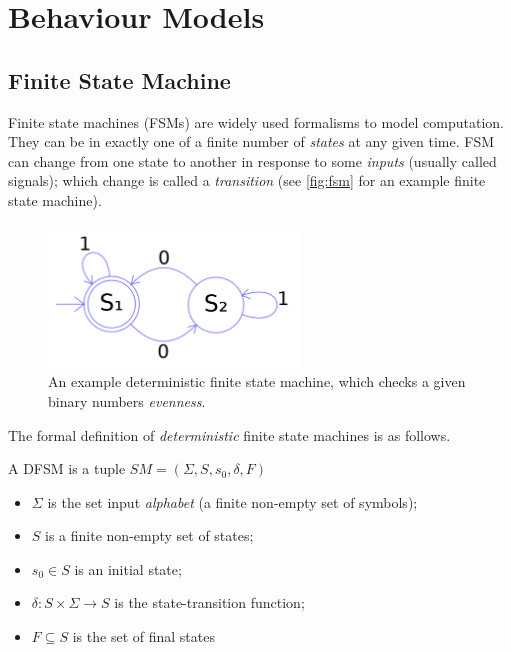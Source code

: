 \section{Behaviour Models}\label{sec:behaviour_models}

\subsection{Finite State Machine}

Finite state machines (FSMs) are widely used formalisms to model computation. They can be in exactly one of a finite number of \emph{states} at any given time. FSM can change from one state to another in response to some \emph{inputs} (usually called signals); which change is called a \emph{transition} (see \autoref{fig:fsm} for an example finite state machine).

\begin{figure}[!ht]
	\centering
	\includegraphics[width=67mm, keepaspectratio]{figures/fsm.png}\hspace{1cm}
	\caption{An example deterministic finite state machine, which checks a given binary numbers \emph{evenness}.}
	\label{fig:fsm}
\end{figure}

The formal definition of \emph{deterministic} finite state machines is as follows.

\begin{definition}
	
	A DFSM is a tuple \( SM = (\Sigma, S, s_0, \delta, F) \)
	
	\begin{itemize}
		\item \(\Sigma\) is the set input \emph{alphabet} (a finite non-empty set of symbols);
		\item \(S\) is a finite non-empty set of states;
		\item \(s_0 \in S\) is an initial state;
		\item \(\delta : S \times \Sigma \rightarrow S \) is the state-transition function;
		\item \(F \subseteq S\) is the set of final states
	\end{itemize}
\end{definition}

